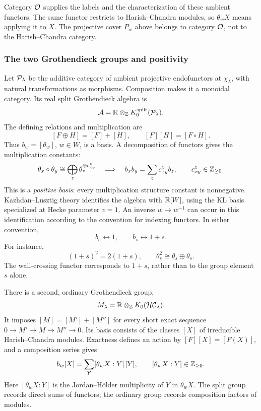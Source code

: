 Category $\mathcal{O}$ supplies the labels and the characterization of these
ambient functors. The same functor restricts to Harish--Chandra modules,
so $\theta_wX$ means applying it to $X$. The projective cover $P_w$ above
belongs to category $\mathcal{O}$, not to the Harish--Chandra category.

\subsubsection{The two Grothendieck groups and positivity}

Let $\mathcal{P}_\lambda$ be the additive category of ambient projective
endofunctors at $\chi_\lambda$, with natural transformations as morphisms.
Composition makes it a monoidal category. Its real split Grothendieck
algebra is
\begin{equation}\label{eq:strict-drop-split-algebra}
  \mathcal A=\mathbb{R}\otimes_{\mathbb{Z}} K_0^{\mathrm{split}}(\mathcal{P}_\lambda).
\end{equation}
The defining relations and multiplication are
\[
  [F\oplus H]=[F]+[H],\qquad [F][H]=[F\circ H].
\]
Thus $b_w=[\theta_w]$, $w\in W$, is a basis. A decomposition of functors
gives the multiplication constants:
\[
  \theta_x\circ\theta_y\cong
  \bigoplus_z\theta_z^{\oplus c_{xy}^z}
  \quad\Longrightarrow\quad
  b_xb_y=\sum_z c_{xy}^z b_z,\qquad c_{xy}^z\in\mathbb{Z}_{\geq0}.
\]
This is a \emph{positive basis}: every multiplication structure constant
is nonnegative. Kazhdan--Lusztig theory identifies the algebra with
$\mathbb{R}[W]$, using the KL basis specialized at Hecke parameter $v=1$.
An inverse $w\mapsto w^{-1}$ can occur in this identification according
to the convention for indexing functors. In either convention,
\[
  b_e\longleftrightarrow1,\qquad b_s\longleftrightarrow1+s.
\]
For instance,
\[
  (1+s)^2=2(1+s),\qquad
  \theta_s^2\cong\theta_s\oplus\theta_s.
\]
The wall-crossing functor corresponds to $1+s$, rather than to the group
element $s$ alone.

There is a second, ordinary Grothendieck group,
\[
  M_\lambda=\mathbb{R}\otimes_{\mathbb{Z}} K_0(\mathcal{HC}_\lambda).
\]
It imposes $[M]=[M']+[M'']$ for every short exact sequence
$0\to M'\to M\to M''\to0$. Its basis consists of the classes $[X]$ of
irreducible Harish--Chandra modules. Exactness defines an action by
$[F][X]=[F(X)]$, and a composition series gives
\begin{equation}\label{eq:strict-drop-positive-action}
  b_w[X]=\sum_Y[\theta_wX:Y]\,[Y],
  \qquad [\theta_wX:Y]\in\mathbb{Z}_{\geq0}.
\end{equation}
Here $[\theta_wX:Y]$ is the Jordan--H\"older multiplicity of $Y$ in
$\theta_wX$. The split group records direct sums of functors; the
ordinary group records composition factors of modules.

